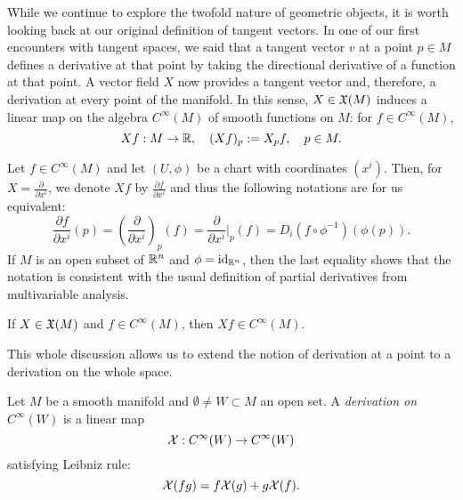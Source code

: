 While we continue to explore the twofold nature of geometric objects, it is worth looking back at our original definition of tangent vectors.
In one of our first encounters with tangent spaces, we said that a tangent vector $v$ at a point $p\in M$ defines a derivative at that point by taking the directional derivative of a function at that point.
A vector field $X$ now provides a tangent vector and, therefore, a derivation at every point of the manifold.
In this sense, $X\in\mathfrak{X}(M)$ induces a linear map on the algebra $C^\infty(M)$ of smooth functions on $M$: for $f\in C^\infty(M)$,
\begin{equation}\label{eq:diff_directional_derivative}
  Xf : M\to\mathbb{R}, \quad
  (Xf)_p := X_p f, \quad p\in M.
\end{equation}

\begin{notation}\label{notation:derivative}
  Let $f\in C^\infty(M)$ and let $(U, \phi)$ be a chart with coordinates $(x^i)$.
  Then, for $X = \frac{\partial}{\partial x^i}$, we denote $Xf$ by $\frac{\partial f}{\partial x^i}$ and thus the following notations are for us equivalent:
  \begin{equation}
    \frac{\partial f}{\partial x^i}(p)
    = \left(\frac{\partial}{\partial x^i}\right)_p(f)
    = \frac{\partial}{\partial x^i}\Big|_p(f)
    = D_i(f\circ\phi^{-1})(\phi(p)).
  \end{equation}
  If $M$ is an open subset of $\mathbb{R}^n$ and $\phi=\operatorname{id}_{\mathbb{R}^n}$, then the last equality shows that the notation is consistent with the usual definition of partial derivatives from multivariable analysis.
\end{notation}

\begin{exercise}
  If $X\in\mathfrak{X}(M)$ and $f\in C^\infty(M)$, then $Xf\in C^\infty(M)$.
\end{exercise}

This whole discussion allows us to extend the notion of derivation at a point to a derivation on the whole space.
\begin{definition}
  Let $M$ be a smooth manifold and $\emptyset\neq W\subset M$ an open set.
  A \emph{derivation on $C^\infty(W)$} is a linear map
  \begin{equation}
    \mathcal{X}:C^\infty(W)\to C^\infty(W)
  \end{equation}
  satisfying Leibniz rule:
  \begin{equation}
    \mathcal{X}(fg) = f \mathcal{X}(g) + g \mathcal{X}(f).
  \end{equation}
\end{definition}

